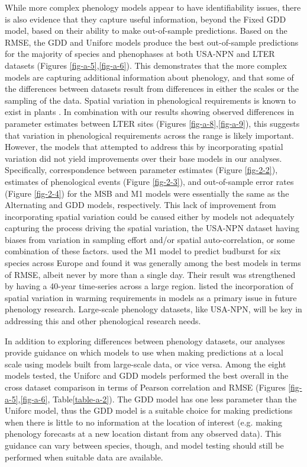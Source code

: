 While more complex phenology models appear to have identifiability issues, there is also evidence that they capture useful information, beyond the Fixed GDD model, based on their ability to make out-of-sample predictions. Based on the RMSE, the GDD and Uniforc models produce the best out-of-sample predictions for the majority of species and phenophases at both USA-NPN and LTER datasets (Figures \ref{fig-a-5},\ref{fig-a-6}). This demonstrates that the more complex models are capturing additional information about phenology, and that some of the differences between datasets result from differences in either the scales or the sampling of the data. Spatial variation in phenological requirements is known to exist in plants \citep{zhang2017}. In combination with our results showing observed differences in parameter estimates between LTER sites (Figures \ref{fig-a-8},\ref{fig-a-9}), this suggests that variation in phenological requirements across the range is likely important. However, the models that attempted to address this by incorporating spatial variation did not yield improvements over their base models in our analyses. Specifically, correspondence between parameter estimates (Figure \ref{fig-2-2}), estimates of phenological events (Figure \ref{fig-2-3}), and out-of-sample error rates (Figure \ref{fig-2-4}) for the MSB and M1 models were essentially the same as the Alternating and GDD models, respectively. This lack of improvement from incorporating spatial variation could be caused either by models not adequately capturing the process driving the spatial variation, the USA-NPN dataset having biases from variation in sampling effort and/or spatial auto-correlation, or some combination of these factors. \cite{basler2016} used the M1 model to predict budburst for six species across Europe and found it was generally among the best models in terms of RMSE, albeit never by more than a single day. Their result was strengthened by having a 40-year time-series across a large region. \cite{chuine2017} listed the incorporation of spatial variation in warming requirements in models as a primary issue in future phenology research. Large-scale phenology datasets, like USA-NPN, will be key in addressing this and other phenological research needs.

In addition to exploring differences between phenology datasets, our analyses provide guidance on which models to use when making predictions at a local scale using models built from large-scale data, or vice versa. Among the eight models tested, the Uniforc and GDD models performed the best overall in the cross dataset comparison in terms of Pearson correlation and RMSE (Figures \ref{fig-a-5},\ref{fig-a-6}, Table\ref{table-a-2}). The GDD model has one less parameter than the Uniforc model, thus the GDD model is a suitable choice for making predictions when there is little to no information at the location of interest (e.g. making phenology forecasts at a new location distant from any observed data). This guidance can vary between species, though, and model testing should still be performed when suitable data are available.

